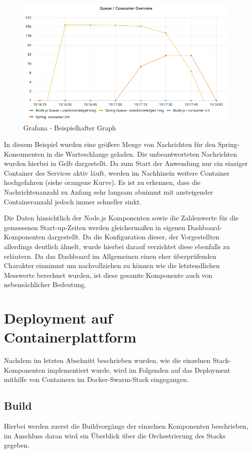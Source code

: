 \begin{figure}
	\centering
	\includegraphics[width=.8\linewidth]{kapitel/problemloesung/implementierung/_img/grafana-graphExample}
	\caption[]{Grafana - Beispielhafter Graph}
	\label{fig:graphEx}
\end{figure}

In diesem Beispiel wurden eine größere Menge von Nachrichten für den Spring-Konsumenten in die Warteschlange geladen. Die unbeantworteten Nachrichten wurden hierbei in Gelb dargestellt. Da zum Start der Anwendung nur ein einziger Container des Services aktiv läuft, werden im Nachhinein weitere Container hochgefahren (siehe orangene Kurve). Es ist zu erkennen, dass die Nachrichtenanzahl zu Anfang sehr langsam abnimmt mit ansteigender Containeranzahl jedoch immer schneller sinkt.

Die Daten hinsichtlich der Node.js Komponenten sowie die Zahlenwerte für die gemessenen Start-up-Zeiten werden gleichermaßen in eigenen Dashboard-Komponenten dargestellt. Da die Konfiguration dieser, der Vorgestellten allerdings deutlich ähnelt, wurde hierbei darauf verzichtet diese ebenfalls zu erläutern. Da das Dashboard im Allgemeinen einen eher überprüfenden Charakter einnimmt um nachvollziehen zu können wie die letztendlichen Messwerte berechnet wurden, ist diese gesamte Komponente auch von nebensächlicher Bedeutung.

\section{Deployment auf Containerplattform \checkmark}
Nachdem im letzten Abschnitt beschrieben wurden, wie die einzelnen Stack-Komponenten implementiert wurde, wird im Folgenden auf das Deployment mithilfe von Containern im Docker-Swarm-Stack eingegangen. 

\subsection{Build \checkmark}
Hierbei werden zuerst die Buildvorgänge der einzelnen Komponenten beschrieben, im Anschluss daran wird ein Überblick über die Orchestrierung des Stacks gegeben.


